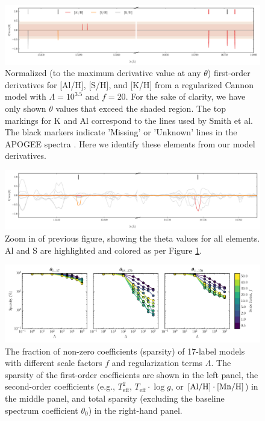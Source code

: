 \documentclass[12pt,preprint]{aastex}
\newcommand{\logg}{\log g}
\newcommand{\Teff}{T_{\mathrm{eff}}}
\begin{document}
\clearpage

\begin{figure}[p]
\includegraphics[width=\textwidth]{sparse-first-order-coefficients.pdf}
\caption{Normalized (to the maximum derivative value at any $\theta$) first-order derivatives for [Al/H], [S/H], and [K/H] from a regularized Cannon model with $\Lambda = 10^{3.5}$ and $f = 20$. For the sake of clarity, we have only shown $\theta$ values that exceed the shaded region. The top markings for K and Al correspond to the lines used by Smith et al. The black markers indicate 'Missing' or 'Unknown' lines in the APOGEE spectra \citep{Shetrone_2015}. Here we identify these elements from our model derivatives.  \label{fig:line-identification}}
\end{figure}

\clearpage

\begin{figure}[p]
\centering
\includegraphics[width=\textwidth]{sparse-first-order-coefficients-zoom.pdf}
\caption{Zoom in of previous figure, showing the theta values for all elements. Al and S are highlighted and colored as per Figure \ref{fig:line-identification}.\label{fig:line-identification-2}}
\end{figure}

\clearpage

\begin{figure}[p]
\centering
\includegraphics[width=\textwidth]{sparsity.pdf}
\caption{The fraction of non-zero coefficients (sparsity) of 17-label models with different scale factors $f$ and regularization terms $\Lambda$.  The sparsity of the first-order coefficients are shown in the left panel, the second-order coefficients (e.g., $\Teff^2$, $\Teff\cdot\logg$, or $[\rm{Al}/\rm{H}]\cdot[\rm{Mn}/\rm{H}]$) in the middle panel, and total sparsity (excluding the baseline spectrum coefficient $\theta_0$) in the right-hand panel.\label{fig:sparsity}}
\end{figure}
\end{document}
